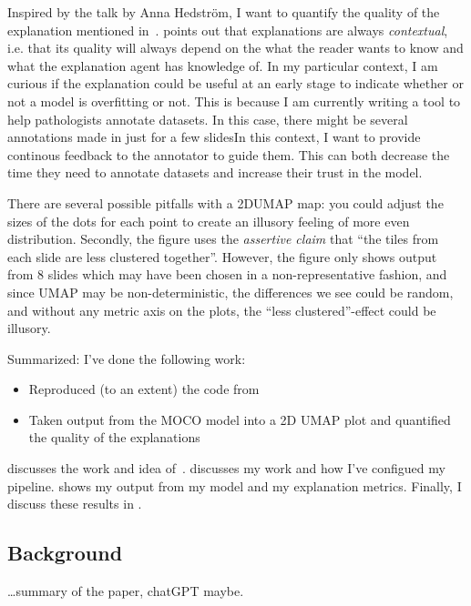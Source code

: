 \documentclass[10pt,twocolumn,letterpaper]{article}
\begin{document}
Inspired by the talk by Anna Hedstr\"{o}m, I want to quantify the quality of the explanation mentioned in~\cite{sslUMAP}. \cite{miller} points out that explanations are always \textit{contextual}, i.e. that its quality will always depend on the what the reader wants to know and what the explanation agent has knowledge of. In my particular context, I am curious if the explanation could be useful at an early stage to indicate whether or not a model is overfitting or not. This is because I am currently writing a tool to help pathologists annotate datasets. In this case, there might be several annotations made in just for a few slidesIn this context, I want to provide continous feedback to the annotator to guide them. This can both decrease the time they need to annotate datasets and increase their trust in the model.

There are several possible pitfalls with a 2D\gls{UMAP} map: you could adjust the sizes of the dots for each point to create an illusory feeling of more even distribution. Secondly, the figure uses the \textit{assertive claim} that ``the tiles from each slide are less clustered together''. However, the figure only shows output from 8 slides which may have been chosen in a non-representative fashion, and since \gls{UMAP} may be non-deterministic, the differences we see could be random, and without any metric axis on the plots, the ``less clustered''-effect could be illusory.

Summarized: I've done the following work:
\begin{itemize}
  \item Reproduced (to an extent) the code from~\cite{sslUMAP}
  \item Taken output from the \gls{MOCO} model into a 2D \gls{UMAP} plot and quantified the quality of the explanations
\end{itemize}
 discusses the work and idea of~.  discusses my work and how I've configued my pipeline.  shows my output from my model and my explanation metrics. Finally, I discuss these results in .

\subsection{Background}\label{sec:background}
\dots{}summary of the paper, chatGPT maybe.

\end{document}
